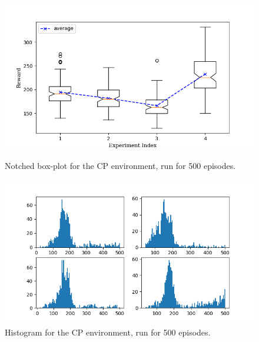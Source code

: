 \documentclass[hidelinks,journal]{IEEEtran}
\begin{document}
\begin{appendices}
\begin{figure}[!h]
  \centering
  \includegraphics[scale=1]{graph/cp3ResBox.png}
  \caption{Notched box-plot for the CP environment, run for 500 episodes.}
  \includegraphics[scale=1]{graph/cp3ResHist.png}
  \caption{Histogram for the CP environment, run for 500 episodes.}
\end{figure}
\pagebreak


\end{appendices}
\end{document}
